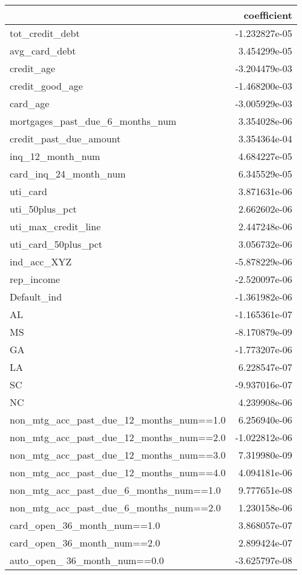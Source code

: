 \begin{tabular}{lr}
\toprule
{} &   coefficient \\
\midrule
tot\_credit\_debt                         & -1.232827e-05 \\
avg\_card\_debt                           &  3.454299e-05 \\
credit\_age                              & -3.204479e-03 \\
credit\_good\_age                         & -1.468200e-03 \\
card\_age                                & -3.005929e-03 \\
mortgages\_past\_due\_6\_months\_num         &  3.354028e-06 \\
credit\_past\_due\_amount                  &  3.354364e-04 \\
inq\_12\_month\_num                        &  4.684227e-05 \\
card\_inq\_24\_month\_num                   &  6.345529e-05 \\
uti\_card                                &  3.871631e-06 \\
uti\_50plus\_pct                          &  2.662602e-06 \\
uti\_max\_credit\_line                     &  2.447248e-06 \\
uti\_card\_50plus\_pct                     &  3.056732e-06 \\
ind\_acc\_XYZ                             & -5.878229e-06 \\
rep\_income                              & -2.520097e-06 \\
Default\_ind                             & -1.361982e-06 \\
AL                                      & -1.165361e-07 \\
MS                                      & -8.170879e-09 \\
GA                                      & -1.773207e-06 \\
LA                                      &  6.228547e-07 \\
SC                                      & -9.937016e-07 \\
NC                                      &  4.239908e-06 \\
non\_mtg\_acc\_past\_due\_12\_months\_num==1.0 &  6.256940e-06 \\
non\_mtg\_acc\_past\_due\_12\_months\_num==2.0 & -1.022812e-06 \\
non\_mtg\_acc\_past\_due\_12\_months\_num==3.0 &  7.319980e-09 \\
non\_mtg\_acc\_past\_due\_12\_months\_num==4.0 &  4.094181e-06 \\
non\_mtg\_acc\_past\_due\_6\_months\_num==1.0  &  9.777651e-08 \\
non\_mtg\_acc\_past\_due\_6\_months\_num==2.0  &  1.230158e-06 \\
card\_open\_36\_month\_num==1.0             &  3.868057e-07 \\
card\_open\_36\_month\_num==2.0             &  2.899424e-07 \\
auto\_open\_ 36\_month\_num==0.0            & -3.625797e-08 \\
\bottomrule
\end{tabular}

